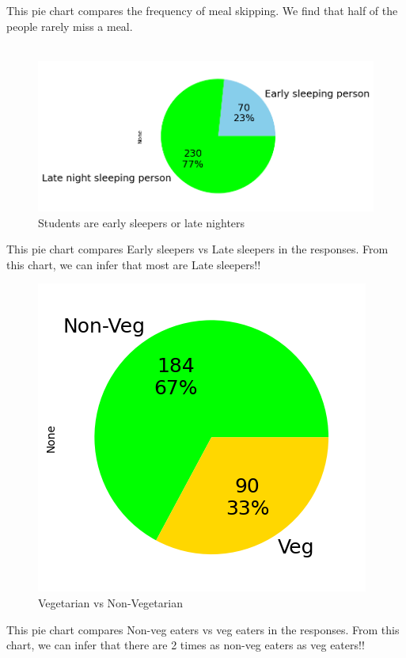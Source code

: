 \documentclass{article}
\begin{document}
This pie chart compares the frequency of meal skipping. We find that half of the people rarely miss a meal.\\\\
\begin{figure}[H]
    \hspace{-22mm}%
    \centering
    \includegraphics[scale = 0.75]{pie_sleep_categoty.png}
    \caption{Students are early sleepers or late nighters}  
    \label{fig:pie_sleep_categoty}
\end{figure}
This pie chart compares Early sleepers vs Late sleepers in the responses. From this chart, we can infer that most are Late sleepers!!
\begin{figure}[H]
    \centering
    \includegraphics[scale = 0.9]{pie_veg_non-veg.png}
    \caption{Vegetarian vs Non-Vegetarian}  
    \label{fig:pie_veg_non-veg}
\end{figure}
This pie chart compares Non-veg eaters vs veg eaters in the responses. From this chart, we can infer that there are 2 times as non-veg eaters as veg eaters!!
\end{document}
